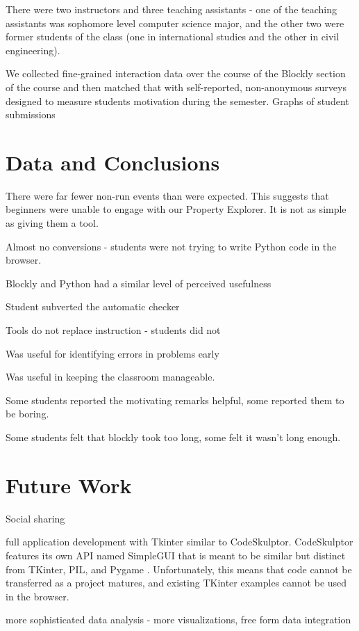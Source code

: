 \documentclass{sig-alternate}
\begin{document}
There were two instructors and three teaching assistants - one of the teaching assistants was sophomore level computer science major, and the other two were former students of the class (one in international studies and the other in civil engineering). 

We collected fine-grained interaction data over the course of the Blockly section of the course and then matched that with self-reported, non-anonymous surveys designed to measure students motivation during the semester.
Graphs of student submissions

\section{Data and Conclusions}

There were far fewer non-run events than were expected. This suggests that beginners were unable to engage with our Property Explorer. It is not as simple as giving them a tool.

Almost no conversions - students were not trying to write Python code in the browser.

Blockly and Python had a similar level of perceived usefulness

Student subverted the automatic checker

Tools do not replace instruction - students did not 

Was useful for identifying errors in problems early

Was useful in keeping the classroom manageable.

Some students reported the motivating remarks helpful, some reported them to be boring.

Some students felt that blockly took too long, some felt it wasn't long enough.

\section{Future Work}

Social sharing

full application development with Tkinter similar to CodeSkulptor. CodeSkulptor features its own API named SimpleGUI that is meant to be similar but distinct from TKinter, PIL, and Pygame \cite{Tang}. Unfortunately, this means that code cannot be transferred as a project matures, and existing TKinter examples cannot be used in the browser.

more sophisticated data analysis - more visualizations, free form data integration
\end{document}
